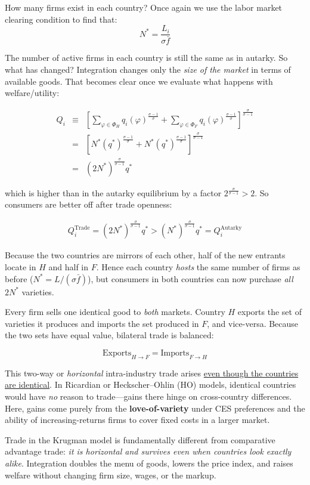 \documentclass[11pt,letterpaper]{article}
\begin{document}
How many firms exist in each country? Once again we use the labor market clearing condition to find that:
\begin{equation*}
    N^* = \frac{L_i}{\sigma \bar{f}}
\end{equation*}

The number of active firms in each country is still the same as in autarky. So what has changed? Integration changes only the \emph{size of the market} in terms of available goods. That becomes clear once we evaluate what happens with welfare/utility:

\begin{eqnarray*}
     Q_i &\equiv& \left[ \sum_{\varphi \in \Phi_H } q_i(
\varphi)^{\tfrac{\sigma-1}{\sigma}} +\sum_{\varphi \in \Phi_F } q_i(
\varphi)^{\tfrac{\sigma-1}{\sigma}} \right]^{\tfrac{\sigma}{\sigma-1} } \\
&=& \left[ N^* (q^*)^{\tfrac{\sigma-1}{\sigma}} +N^* (q^*)^{\tfrac{\sigma-1}{\sigma}} \right]^{\tfrac{\sigma}{\sigma-1} }\\
&=& (2 N^*)^{\frac{\sigma}{\sigma-1}} q^*
\end{eqnarray*}

\noindent which is higher than in the autarky equilibrium by a factor $2^{\frac{\sigma}{\sigma-1}}>2$. So consumers are better off after trade openness:

\begin{eqnarray*}
         Q_i^{\text{Trade}} = (2 N^*)^{\frac{\sigma}{\sigma-1}} q^* > (N^*)^{\frac{\sigma}{\sigma-1}} q^* =Q_i^{\text{Autarky}}
\end{eqnarray*}

Because the two countries are mirrors of each other, half of the new entrants locate in $H$ and half in $F$. Hence each country \emph{hosts} the same number of firms as before ($N^{*}=L/(\sigma\bar f)$), but
consumers in both countries can now purchase \emph{all} $2N^*$ varieties.

Every firm sells one identical good to \emph{both} markets.  Country $H$ exports the set of varieties it produces and imports the set produced in $F$, and vice-versa.  Because the two sets have equal value, bilateral
trade is balanced:

\begin{equation*}
    \text{Exports}_{H\to F} = \text{Imports}_{F\to H}
\end{equation*}

This two-way or \emph{horizontal} intra-industry trade arises \underline{even though the countries are identical}.  In Ricardian or Heckscher–Ohlin (HO) models, identical countries would have \emph{no} reason to trade—gains there hinge on cross-country differences.  Here, gains come purely from the \textbf{love-of-variety} under CES preferences and the ability of increasing-returns firms to cover fixed costs in a larger market.

Trade in the Krugman model is fundamentally different from comparative advantage trade: \emph{it is horizontal and survives even when countries look exactly alike}.  Integration doubles the menu of goods, lowers the price index, and raises welfare without changing firm size, wages, or the markup.
\end{document}
